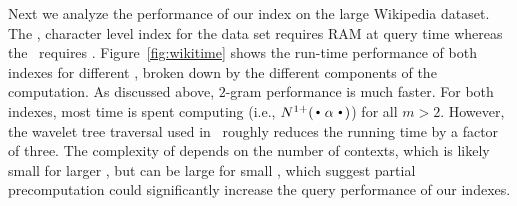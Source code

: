 Next we analyze the performance of our index on the large Wikipedia dataset.
The \singleCST, character level index for the data set requires  RAM
at query time whereas the \dualCST\ requires . Figure~\ref{fig:wikitime}
shows the run-time performance of both indexes for different \ngrams, broken
down by the different components of the computation. As discussed above,
$2$-gram performance is much faster. For both indexes, most time is spent
computing \nlplusfrontbackname (i.e., $\nlplus{\dotpatdot}$) for all $m>2$. However,
the wavelet tree traversal used in \singleCST\ roughly reduces the running time
by a factor of three. The complexity of \nlplusfrontbackname depends on the
number of contexts, which is likely small for larger \ngrams, but can be large
for small \ngrams, which suggest partial precomputation could significantly
increase the query performance of our indexes.








